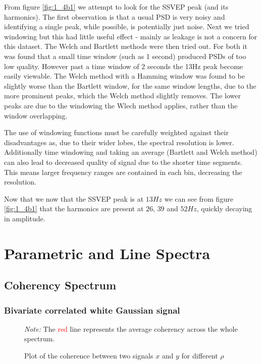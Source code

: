 \documentclass[10pt,twoside,a4paper]{report}
\begin{document}
From figure \ref{fig:1_4b1} we attempt to look for the SSVEP peak (and its harmonics). The first observation is that a usual PSD is very noisy and identifying a single peak, while possible, is potentially just noise. Next we tried windowing but this had little useful effect - mainly as leakage is not a concern for this dataset. The Welch and Bartlett methods were then tried out. For both it was found that a small time window (such as 1 second) produced PSDs of too low quality. However past a time window of 2 seconds the 13Hz peak become easily viewable. The Welch method with a Hamming window was found to be slightly worse than the Bartlett window, for the same window lengths, due to the more prominent peaks, which the Welch method slightly removes. The lower peaks are due to the windowing the Wlech method applies, rather than the window overlapping. 

The use of windowing functions must be carefully weighted against their disadvantages as, due to their wider lobes, the spectral resolution is lower.  Additionally time windowing and taking an average (Bartlett and Welch method) can also lead to decreased quality of signal due to the shorter time segments. This means larger frequency ranges are contained in each bin, decreasing the resolution.

Now that we now that the SSVEP peak is at $13Hz$ we can see from figure \ref{fig:1_4b1} that the harmonics are present at $26$, $39$ and $52Hz$, quickly decaying in amplitude.

\chapter{Parametric and Line Spectra}
\section{Coherency Spectrum}
\subsection{Bivariate correlated white Gaussian signal}
\begin{figure}[h!]
\centering
\resizebox{\textwidth}{!}{}
%
\textit{Note:} The \textcolor{red}{red} line represents the average coherency across the whole spectrum.
\caption{Plot of the coherence between two signals $x$ and $y$ for different $\rho$}
\label{fig:2_1a}
\end{figure}
\end{document}
